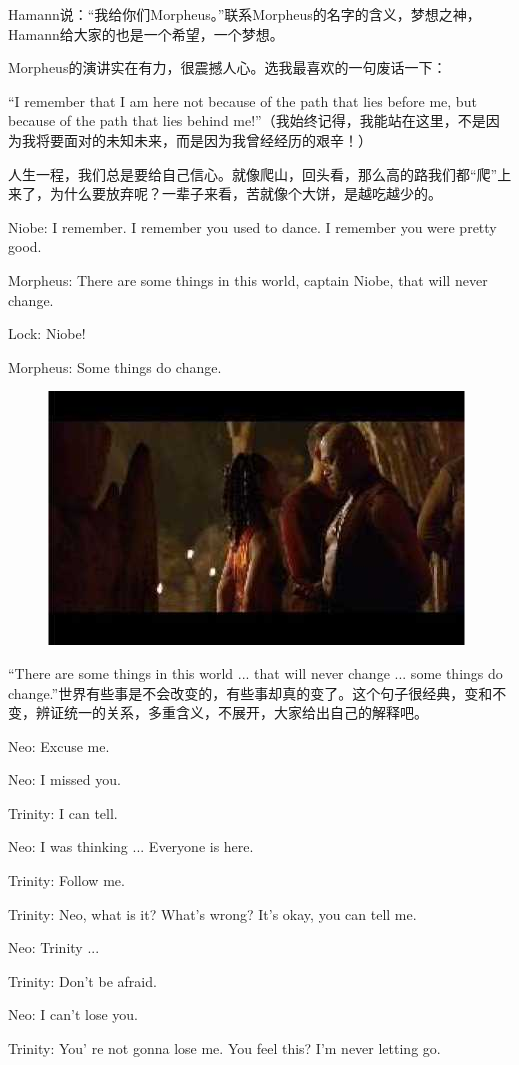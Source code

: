 \documentclass{ctexart}
\newenvironment{myquote}{\color{green} \setlength{\leftskip}{6em} \setlength{\rightskip}{4em} \setlength{\parindent}{-2em}}{\par}
\begin{document}
Hamann说：“我给你们Morpheus。”联系Morpheus的名字的含义，梦想之神，Hamann给大家的也是一个希望，一个梦想。

Morpheus的演讲实在有力，很震撼人心。选我最喜欢的一句废话一下：

“I remember that I am here not because of the path that lies before me, but because of the path that lies behind me!”（我始终记得，我能站在这里，不是因为我将要面对的未知未来，而是因为我曾经经历的艰辛！）

人生一程，我们总是要给自己信心。就像爬山，回头看，那么高的路我们都“爬”上来了，为什么要放弃呢？一辈子来看，苦就像个大饼，是越吃越少的。

\begin{myquote}
Niobe: I remember. I remember you used to dance. I remember you were pretty good.

Morpheus: There are some things in this world, captain Niobe, that will never change.

Lock: Niobe!

Morpheus: Some things do change.
\end{myquote}

\begin{figure}[htb]
\centering
\includegraphics[width=0.5\linewidth]{fig/read_reloaded-42}
\end{figure}

“There are some things in this world ... that will never change ... some things do change.”世界有些事是不会改变的，有些事却真的变了。这个句子很经典，变和不变，辨证统一的关系，多重含义，不展开，大家给出自己的解释吧。

\begin{myquote}
Neo: Excuse me.

Neo: I missed you.

Trinity: I can tell.

Neo: I was thinking ... Everyone is here.

Trinity: Follow me.

Trinity: Neo, what is it? What's wrong? It's okay, you can tell me.

Neo: Trinity ...

Trinity: Don't be afraid.

Neo: I can't lose you.

Trinity: You' re not gonna lose me. You feel this? I'm never letting go.
\end{myquote}
\end{document}
